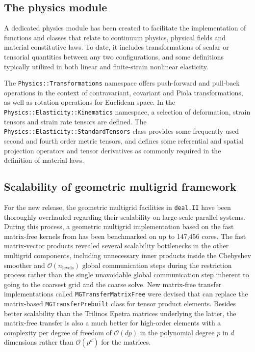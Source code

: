\documentclass{ansarticle-preprint}
\newcommand{\specialword}[1]{\texttt{#1}}
\newcommand{\dealii}{{\specialword{deal.II}}}
\begin{document}
\subsection{The physics module}

A dedicated physics module has been created to facilitate the implementation of functions and classes that relate to continuum physics, physical fields and material constitutive laws.
To date, it includes transformations of scalar or tensorial quantities between any two configurations, and some definitions typically utilized in both linear and finite-strain nonlinear elasticity.

The \verb!Physics::Transformations! namespace offers push-forward and pull-back operations in the context of contravariant, covariant and Piola transformations, as well as rotation operations for Euclidean space.
In the \verb!Physics::Elasticity::Kinematics! namespace, a selection of deformation, strain tensors and strain rate tensors are defined.
The \verb!Physics::Elasticity::StandardTensors! class provides some frequently used second and fourth order metric tensors, and defines some referential and spatial projection operators and tensor derivatives as commonly required in the definition of material laws.

\subsection{Scalability of geometric multigrid framework}

For the new release, the geometric multigrid facilities in \dealii{} have been
thoroughly overhauled regarding their scalability on large-scale parallel
systems. During this process, a geometric multigrid implementation based on
the fast matrix-free kernels from \cite{KronbichlerKormann2012} has been
benchmarked on up to 147,456 cores. The fast matrix-vector products revealed
several scalability bottlenecks in the other multigrid components, including
unnecessary inner products inside the Chebyshev smoother and
$\mathcal O(n_\text{levels})$ global communication steps during the
restriction process rather than the single unavoidable global communication
step inherent to going to the coarsest grid and the coarse solve. New
matrix-free transfer implementations called \texttt{MGTransferMatrixFree} were
devised that can replace the matrix-based \texttt{MGTransferPrebuilt} class
for tensor product elements. Besides better scalability than the Trilinos
Epetra matrices underlying the latter, the matrix-free transfer is also a much
better for high-order elements with a complexity per degree of freedom of
$\mathcal O(d p)$ in the polynomial degree $p$ in $d$ dimensions rather than
$\mathcal O(p^d)$ for the matrices.
\end{document}
